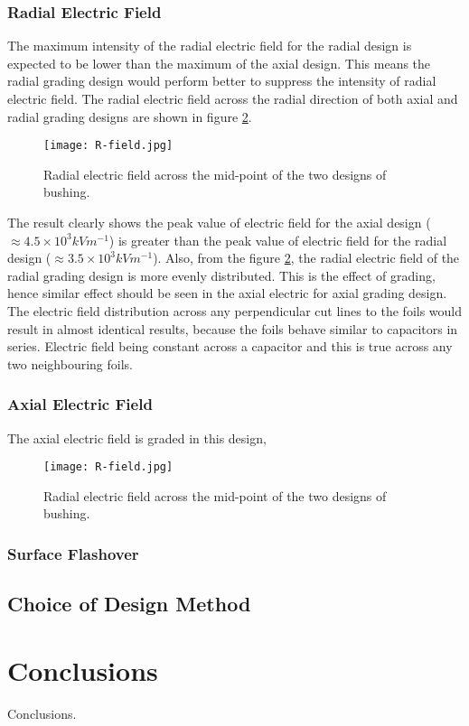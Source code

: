\subsubsection{Radial Electric Field}
The maximum intensity of the radial electric field for the radial design is expected to be lower than the maximum of the axial design. This means the radial grading design would perform better to suppress the intensity of radial electric field. The radial electric field across the radial direction of both axial and radial grading designs are shown in figure \ref{figure:rfield}.

\begin{figure}[!h]
\centering
\texttt{[image: R-field.jpg]}
\caption{Radial electric field across the mid-point of the two designs of bushing.}
\label{figure:rfield}
\end{figure}

The result clearly shows the peak value of electric field for the axial design ($\approx 4.5 \times 10^3 kVm^{-1}$) is greater than the peak value of electric field for the radial design ($\approx 3.5 \times 10^3 kVm^{-1}$). Also, from the figure \ref{figure:rfield}, the radial electric field of the radial grading design is more evenly distributed. This is the effect of grading, hence similar effect should be seen in the axial electric for axial grading design. The electric field distribution across any perpendicular cut lines to the foils would result in almost identical results, because the foils behave similar to capacitors in series. Electric field being constant across a capacitor and this is true across any two neighbouring foils.

\subsubsection{Axial Electric Field}
The axial electric field is graded in this design,  

\begin{figure}[!h]
\centering
\texttt{[image: R-field.jpg]}
\caption{Radial electric field across the mid-point of the two designs of bushing.}
\label{figure:rfield}
\end{figure}

\subsubsection{Surface Flashover}

\subsection{Choice of Design Method}

\section{Conclusions}
Conclusions.